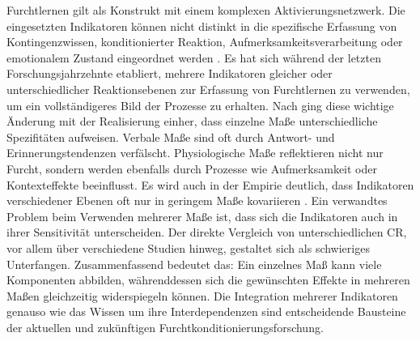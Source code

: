 	Furchtlernen gilt als Konstrukt mit einem komplexen Aktivierungsnetzwerk. Die eingesetzten Indikatoren können nicht distinkt in die spezifische Erfassung von Kontingenzwissen, konditionierter Reaktion, Aufmerksamkeitsverarbeitung oder emotionalem Zustand eingeordnet werden \parencite{LIPP2006}. Es hat sich während der letzten Forschungsjahrzehnte etabliert, mehrere Indikatoren gleicher oder unterschiedlicher Reaktionsebenen zur Erfassung von Furchtlernen zu verwenden, um ein vollständigeres Bild der Prozesse zu erhalten. Nach \textcite{LIPP2006} ging diese wichtige Änderung mit der Realisierung einher, dass einzelne Maße unterschiedliche Spezifitäten aufweisen. Verbale Maße sind oft durch Antwort- und Erinnerungstendenzen verfälscht. Physiologische Maße reflektieren nicht nur Furcht, sondern werden ebenfalls durch Prozesse wie Aufmerksamkeit oder Kontexteffekte beeinflusst. Es wird auch in der Empirie deutlich, dass Indikatoren verschiedener Ebenen oft nur in geringem Maße kovariieren \parencite{BRADLEY2000, LIPP2006}. 
	Ein verwandtes Problem beim Verwenden mehrerer Maße ist, dass sich die Indikatoren auch in ihrer Sensitivität unterscheiden. Der direkte Vergleich von unterschiedlichen CR, vor allem über verschiedene Studien hinweg, gestaltet sich als schwieriges Unterfangen. 
	Zusammenfassend bedeutet das: Ein einzelnes Maß kann viele Komponenten abbilden, währenddessen sich die gewünschten Effekte in mehreren Maßen gleichzeitig widerspiegeln können.
	Die Integration mehrerer Indikatoren genauso wie das Wissen um ihre Interdependenzen sind entscheidende Bausteine der aktuellen und zukünftigen Furchtkonditionierungsforschung. 
	
